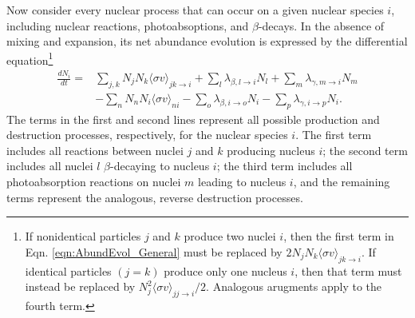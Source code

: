 Now consider every nuclear process that can occur on a given nuclear species $i$, including nuclear reactions, photoabsoptions, and $\beta$-decays. In the absence of mixing and expansion, its net abundance evolution is expressed by the differential equation\footnote{If nonidentical particles $j$ and $k$ produce two nuclei $i$, then the first term in Eqn. \ref{eqn:AbundEvol_General} must be replaced by $2N_{j}N_{k}\langle \sigma v \rangle_{jk \rightarrow i}$. If identical particles $(j = k)$ produce only one nucleus $i$, then that term must instead be replaced by $N_{j}^{2}\langle \sigma v \rangle_{jj \rightarrow i}/2$. Analogous arugments apply to the fourth term.}
\begin{align}
\frac{dN_{i}}{dt} = &\sum_{j,k} N_{j}N_{k} \langle \sigma v \rangle_{jk \rightarrow i} + \sum_{l} \lambda_{\beta, l \rightarrow i} N_{l} + \sum_{m} \lambda_{\gamma, m \rightarrow i} N_{m} \nonumber \\
&- \sum_{n} N_{n}N_{i}\langle \sigma v \rangle_{ni} - \sum_{o} \lambda_{\beta, i \rightarrow o} N_{i} - \sum_{p} \lambda_{\gamma, i \rightarrow p} N_{i}. \label{eqn:AbundEvol_General}
\end{align}
The terms in the first and second lines represent all possible production and destruction processes, respectively, for the nuclear species $i$. The first term includes all reactions between nuclei $j$ and $k$ producing nucleus $i$; the second term includes all nuclei $l$ $\beta$-decaying to nucleus $i$; the third term includes all photoabsorption reactions on nuclei $m$ leading to nucleus $i$, and the remaining terms represent the analogous, reverse destruction processes.

